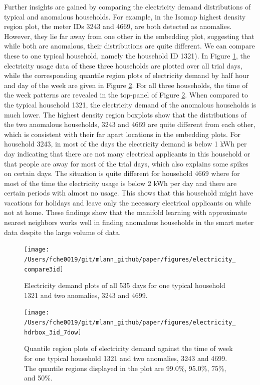 \documentclass[12pt]{article}
\begin{document}
Further insights are gained by comparing the electricity demand distributions of typical and anomalous households. For example, in the Isomap highest density region plot, the meter IDs 3243 and 4669, are both detected as anomalies. However, they lie far away from one other in the embedding plot, suggesting that while both are anomalous, their distributions are quite different. We can compare these to one typical household, namely the household ID 1321). In Figure \ref{fig:compare3ids}, the electricity usage data of these three households are plotted over all trial days, while the corresponding quantile region plots of electricity demand by half hour and day of the week are given in Figure \ref{fig:hdrboxplot3ids}. For all three households, the time of the week patterns are revealed in the top-panel of Figure \ref{fig:hdrboxplot3ids}. When compared to the typical household 1321, the electricity demand of the anomalous households is much lower. The highest density region boxplots show that the distributions of the two anomalous households, 3243 and 4669 are quite different from each other, which is consistent with their far apart locations in the embedding plots. For household 3243, in most of the days the electricity demand is below 1 kWh per day indicating that there are not many electrical applicants in this household or that people are away for most of the trial days, which also explains some spikes on certain days. The situation is quite different for household 4669 where for most of the time the electricity usage is below 2 kWh per day and there are certain periods with almost no usage. This shows that this household might have vacations for holidays and leave only the necessary electrical applicants on while not at home. These findings show that the manifold learning with approximate nearest neighbors works well in finding anomalous households in the smart meter data despite the large volume of data.

\begin{figure}

{\centering \texttt{[image: /Users/fche0019/git/mlann\_github/paper/figures/electricity\_compare3id]} 

}

\caption{Electricity demand plots of all 535 days for one typical household 1321 and two anomalies, 3243 and 4699. }\label{fig:compare3ids}
\end{figure}
\begin{figure}

{\centering \texttt{[image: /Users/fche0019/git/mlann\_github/paper/figures/electricity\_hdrbox\_3id\_7dow]} 

}

\caption{Quantile region plots of electricity demand against the time of week for one typical household 1321 and two anomalies, 3243 and 4699. The quantile regions displayed in the plot are 99.0\%, 95.0\%, 75\%, and 50\%. }\label{fig:hdrboxplot3ids}
\end{figure}
\end{document}
